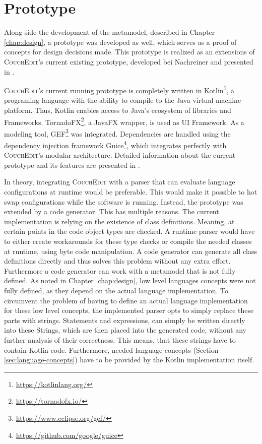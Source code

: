 \chapter{Prototype}
\label{chap:prototype}
Along side the development of the metamodel, described in Chapter \ref{chap:design}, a prototype was developed as well, which serves as a proof of concepts for design decisions made. This prototype is realized as an extensions of \textsc{CouchEdit}'s current existing prototype, developed bei Nachreiner and presented in \cite{nachreiner_couchedit_2020}.

\textsc{CouchEdit}'s current running prototype is completely written in Kotlin\footnote{\url{https://kotlinlang.org/}}, a programing language with the ability to compile to the Java virtual machine platform. Thus, Kotlin enables access to Java's ecosystem of libraries and Frameworks. TornadoFX\footnote{\url{https://tornadofx.io/}}, a JavaFX wrapper, is used as UI Framework. As a modeling tool, GEF\footnote{\url{https://www.eclipse.org/gef/}} was integrated. Dependencies are handled using the dependency injection framework Guice\footnote{\url{https://github.com/google/guice}}, which integrates perfectly with \textsc{CouchEdit}'s modular architecture. Detailed information about the current prototype and its features are presented in \cite{nachreiner_couchedit_2020}.

In theory, integrating \textsc{CouchEdit} with a parser that can evaluate language configurations at runtime would be preferable. This would make it possible to hot swap configurations while the software is running. Instead, the prototype was extended by a code generator. This has multiple reasons. The current implementation is relying on the existence of class definitions. Meaning, at certain points in the code object types are checked. A runtime parser would have to either create workarounds for these type checks or compile the needed classes at runtime, using byte code manipulation. A code generator can generate all class definitions directly and thus solves this problem without any extra effort. Furthermore a code generator can work with a metamodel that is not fully defined. As noted in Chapter \ref{chap:design}, low level languages concepts were not fully defined, as they depend on the actual language implementation. To circumvent the problem of having to define an actual language implementation for these low level concepts, the implemented parser opts to simply replace these parts with strings. Statements and expressions, can simply be written directly into these Strings, which are then placed into the generated code, without any further analysis of their correctness. This means, that these strings have to contain Kotlin code. Furthermore, needed language concepts (Section \ref{sec:language-concepts}) have to be provided by the Kotlin implementation itself.

